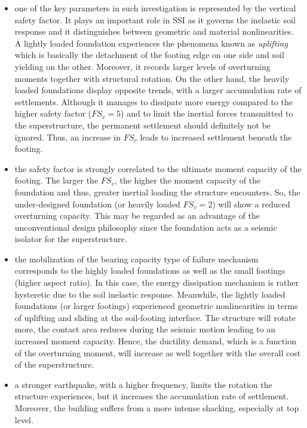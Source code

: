 \begin{itemize} 
	\item one of the key parameters in such investigation is represented by the vertical safety factor. It plays an important role in SSI as it governs the inelastic soil response and it distinguishes between geometric and material nonlinearities. A lightly loaded foundation experiences the phenomena known as \textit{uplifting} which is basically the detachment of the footing edge on one side and soil yielding on the other. Moreover, it records larger levels of overturning moments together with structural rotation. On the other hand, the heavily loaded foundations display opposite trends, with a larger accumulation rate of settlements. Although it manages to dissipate more energy compared to the higher safety factor ($FS_v=5$) and to limit the inertial forces transmitted to the superstructure, the permanent settlement should definitely not be ignored. Thus, an increase in $FS_v$ leads to increased settlement beneath the footing.
	\item the safety factor is strongly correlated to the ultimate moment capacity of the footing. The larger the $FS_v$, the higher the moment capacity of the foundation and thus, greater inertial loading the structure encounters. So, the under-designed foundation (or heavily loaded $FS_v=2$) will show a reduced overturning capacity. This may be regarded as an advantage of the unconventional design philosophy since the foundation acts as a seismic isolator for the superstructure.
	\item the mobilization of the bearing capacity type of failure mechanism corresponds to the highly loaded foundations as well as the small footings (higher aspect ratio). In this case, the energy dissipation mechanism is rather hysteretic due to the soil inelastic response. Meanwhile, the lightly loaded foundations (or larger footings) experienced geometric nonlinearities in terms of uplifting and sliding at the soil-footing interface. The structure will rotate more, the contact area reduces during the seismic motion leading to an increased moment capacity. Hence, the ductility demand, which is a function of the overturning moment, will increase as well together with the overall cost of the superstructure.
	\item a stronger earthquake, with a higher frequency, limits the rotation the structure experiences, but it increases the accumulation rate of settlement. Moreover, the building suffers from a more intense shacking, especially at top level. 

\end{itemize}
